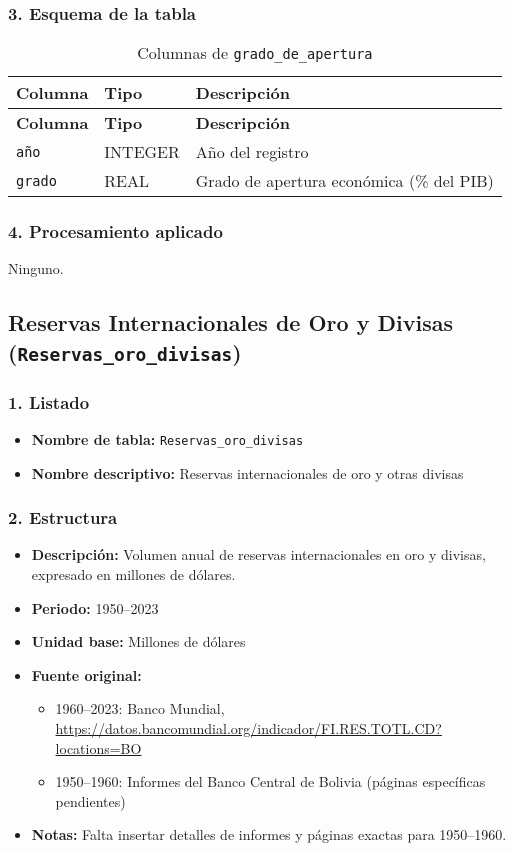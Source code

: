 \documentclass[12pt,a4paper]{article}
\begin{document}
\subsubsection*{3. Esquema de la tabla}
\begin{longtable}{@{}lll@{}}
\caption{Columnas de \texttt{grado\_de\_apertura}}\\
\toprule
\textbf{Columna} & \textbf{Tipo} & \textbf{Descripción} \\
\midrule
\endfirsthead
\toprule
\textbf{Columna} & \textbf{Tipo} & \textbf{Descripción} \\
\midrule
\endhead
\bottomrule
\endfoot
\texttt{año}   & INTEGER & Año del registro \\
\texttt{grado} & REAL    & Grado de apertura económica (\% del PIB) \\
\end{longtable}

\subsubsection*{4. Procesamiento aplicado}
Ninguno.


\newpage
\subsection{Reservas Internacionales de Oro y Divisas (\texttt{Reservas\_oro\_divisas})}

\subsubsection*{1. Listado}
\begin{itemize}
  \item \textbf{Nombre de tabla:} \texttt{Reservas\_oro\_divisas}
  \item \textbf{Nombre descriptivo:} Reservas internacionales de oro y otras divisas
\end{itemize}

\subsubsection*{2. Estructura}
\begin{itemize}
  \item \textbf{Descripción:} Volumen anual de reservas internacionales en oro y divisas, expresado en millones de dólares.
  \item \textbf{Periodo:} 1950--2023
  \item \textbf{Unidad base:} Millones de dólares
  \item \textbf{Fuente original:}
    \begin{itemize}
      \item 1960--2023: Banco Mundial, \url{https://datos.bancomundial.org/indicador/FI.RES.TOTL.CD?locations=BO}
      \item 1950--1960: Informes del Banco Central de Bolivia (páginas específicas pendientes)
    \end{itemize}
  \item \textbf{Notas:} Falta insertar detalles de informes y páginas exactas para 1950–1960.
\end{itemize}
\end{document}
